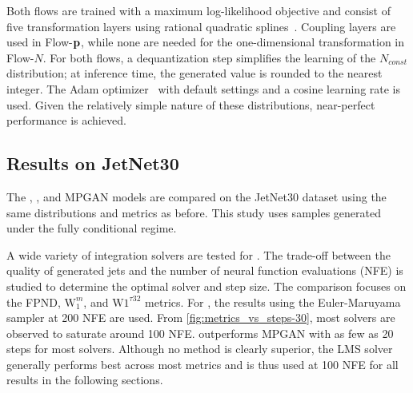 Both flows are trained with a maximum log-likelihood objective and consist of five transformation layers using rational quadratic splines~\cite{NeuralSplineFlows}.
Coupling layers are used in Flow-$\mathbf{p}$, while none are needed for the one-dimensional transformation in Flow-$N$.
For both flows, a dequantization step simplifies the learning of the $N_{const}$ distribution; at inference time, the generated value is rounded to the nearest integer.
The Adam optimizer~\cite{Adam} with default settings and a cosine learning rate is used.
Given the relatively simple nature of these distributions, near-perfect performance is achieved.

\subsection{Results on JetNet30}

The \pcdroid, \pcjedi, and MPGAN models are compared on the JetNet30 dataset using the same distributions and metrics as before.
This study uses \pcdroid samples generated under the fully conditional regime.

A wide variety of integration solvers are tested for \pcdroid.
The trade-off between the quality of generated jets and the number of neural function evaluations (NFE) is studied to determine the optimal solver and step size.
The comparison focuses on the FPND, $\mathrm{W}_1^m$, and $\mathrm{W}1^{\tau{32}}$ metrics.
For \pcjedi, the results using the Euler-Maruyama sampler at 200 NFE are used.
From \cref{fig:metrics_vs_steps-30}, most solvers are observed to saturate around 100 NFE.
\pcdroid outperforms MPGAN with as few as 20 steps for most solvers.
Although no method is clearly superior, the LMS solver generally performs best across most metrics and is thus used at 100 NFE for all \pcdroid results in the following sections.

